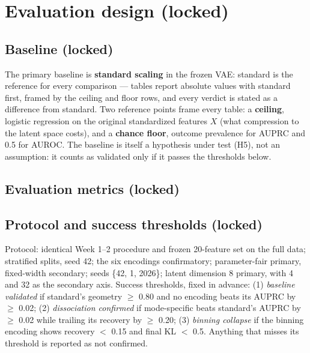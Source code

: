 \documentclass[onecolumn]{sigchi}
\begin{document}
\section{Evaluation design (locked)}
\subsection{Baseline (locked)}
The primary baseline is \textbf{standard scaling} in the frozen VAE:
standard is the reference for every comparison --- tables report absolute
values with standard first, framed by the ceiling and floor rows, and
every verdict is stated as a difference from standard.
Two reference points frame every table: a \textbf{ceiling}, logistic
regression on the original standardized features $X$ (what compression to
the latent space costs), and a \textbf{chance floor}, outcome prevalence
for AUPRC and 0.5 for AUROC. The baseline is itself a hypothesis under test
(H5), not an assumption: it counts as validated only if it passes the
thresholds below.

\subsection{Evaluation metrics (locked)}
\begin{table}
\centering
\small
\setlength{\tabcolsep}{4pt}
\caption{Locked evaluation metrics: three categories, one primary each.
AUPRC is primary because the outcome is rare. Per-encoding diagnostics
(final KL, seed SDs, instability log) are reported but never compared
across encodings; a clustering check (k-means ARI) is exploratory only.}
\end{table}

\subsection{Protocol and success thresholds (locked)}
Protocol: identical Week 1--2 procedure and frozen 20-feature set on the
full data; stratified splits, seed 42; the six encodings confirmatory;
parameter-fair primary, fixed-width secondary; seeds \{42, 1, 2026\};
latent dimension 8 primary, with 4 and 32 as the secondary axis. Success
thresholds, fixed in advance:
(1) \emph{baseline validated} if standard's geometry $\geq$ 0.80 and no
encoding beats its AUPRC by $\geq$ 0.02;
(2) \emph{dissociation confirmed} if mode-specific beats standard's AUPRC
by $\geq$ 0.02 while trailing its recovery by $\geq$ 0.20;
(3) \emph{binning collapse} if the binning encoding shows recovery
$<$ 0.15 and final KL $<$ 0.5.
Anything that misses its threshold is reported as not confirmed.
\end{document}
